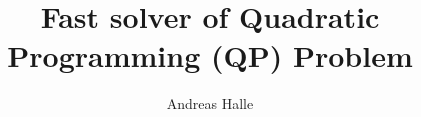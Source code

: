 \documentclass[a4paper]{report}
\begin{document}
\newcommand*\printpoint[2]{(%
\pgfmathparse{0.03514598035*#1}\pgfmathprintnumber{\pgfmathresult},%
\pgfmathparse{0.03514598035*#2}\pgfmathprintnumber{\pgfmathresult})%
}

\title{Fast solver of Quadratic Programming (QP) Problem}
\author{Andreas Halle}

\maketitle

\tableofcontents












{}

\end{document}
